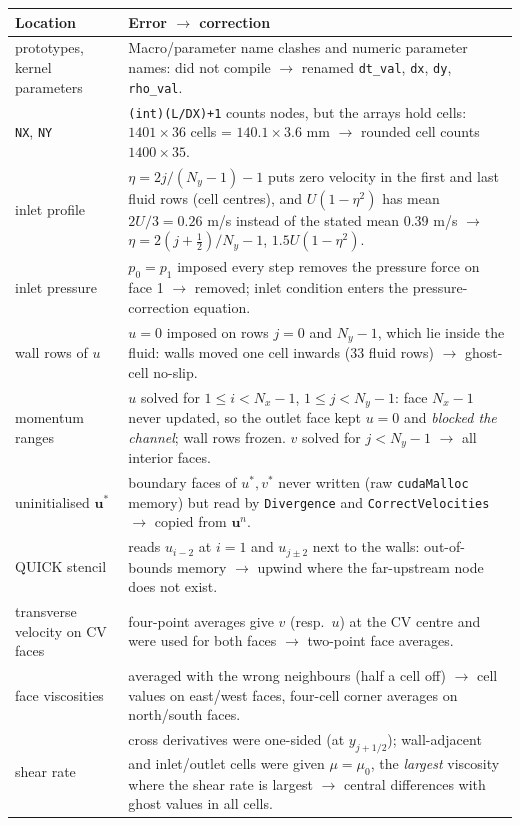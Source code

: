 {\small
\begin{longtable}{p{3.5cm}p{11.7cm}}\toprule
Location & Error $\rightarrow$ correction\\\midrule\endhead
prototypes, kernel parameters & Macro/parameter name clashes and numeric parameter names: did not compile $\rightarrow$ renamed \texttt{dt\_val}, \texttt{dx}, \texttt{dy}, \texttt{rho\_val}.\\
\texttt{NX}, \texttt{NY} & \texttt{(int)(L/DX)+1} counts nodes, but the arrays hold cells: $1401\times36$ cells = $140.1\times3.6$ mm $\rightarrow$ rounded cell counts $1400\times35$.\\
inlet profile & $\eta=2j/(N_y-1)-1$ puts zero velocity in the first and last fluid rows (cell centres), and $U(1-\eta^2)$ has mean $2U/3=0.26$ m/s instead of the stated mean 0.39 m/s $\rightarrow$ $\eta=2(j+\frac12)/N_y-1$, $1.5U(1-\eta^2)$.\\
inlet pressure & $p_0=p_1$ imposed every step removes the pressure force on face 1 $\rightarrow$ removed; inlet condition enters the pressure-correction equation.\\
wall rows of $u$ & $u=0$ imposed on rows $j=0$ and $N_y-1$, which lie inside the fluid: walls moved one cell inwards (33 fluid rows) $\rightarrow$ ghost-cell no-slip.\\
momentum ranges & $u$ solved for $1\le i<N_x-1$, $1\le j<N_y-1$: face $N_x-1$ never updated, so the outlet face kept $u=0$ and \emph{blocked the channel}; wall rows frozen. $v$ solved for $j<N_y-1$ $\rightarrow$ all interior faces.\\
uninitialised $\mathbf{u}^*$ & boundary faces of $u^*,v^*$ never written (raw \texttt{cudaMalloc} memory) but read by \texttt{Divergence} and \texttt{CorrectVelocities} $\rightarrow$ copied from $\mathbf{u}^n$.\\
QUICK stencil & reads $u_{i-2}$ at $i=1$ and $u_{j\pm2}$ next to the walls: out-of-bounds memory $\rightarrow$ upwind where the far-upstream node does not exist.\\
transverse velocity on CV faces & four-point averages give $v$ (resp.\ $u$) at the CV centre and were used for both faces $\rightarrow$ two-point face averages.\\
face viscosities & averaged with the wrong neighbours (half a cell off) $\rightarrow$ cell values on east/west faces, four-cell corner averages on north/south faces.\\
shear rate & cross derivatives were one-sided (at $y_{j+1/2}$); wall-adjacent and inlet/outlet cells were given $\mu=\mu_0$, the \emph{largest} viscosity where the shear rate is largest $\rightarrow$ central differences with ghost values in all cells.\\

\end{longtable}}
